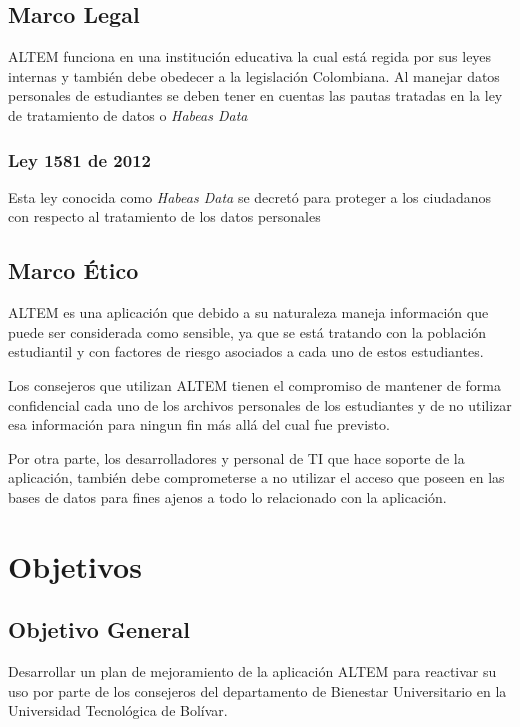 \subsection{Marco Legal}
ALTEM funciona en una institución educativa la cual está regida por sus leyes internas y también debe obedecer a la legislación Colombiana. Al manejar datos personales de estudiantes se deben tener en cuentas las pautas tratadas en la ley de tratamiento de datos o \textit{Habeas Data}

\subsubsection{ Ley 1581 de 2012 }
Esta ley conocida como \textit{Habeas Data} se decretó para proteger a los ciudadanos con respecto al tratamiento de los datos personales

\subsection{Marco Ético}
ALTEM es una aplicación que debido a su naturaleza maneja información que puede ser considerada como sensible, ya que se está tratando con la población estudiantil y con factores de riesgo asociados a cada uno de estos estudiantes. 

Los consejeros que utilizan ALTEM tienen el compromiso de mantener de forma confidencial cada uno de los archivos personales de los estudiantes y de no utilizar esa información para ningun fin más allá del cual fue previsto.

Por otra parte, los desarrolladores y personal de TI que hace soporte de la aplicación, también debe comprometerse a no utilizar el acceso que poseen en las bases de datos para fines ajenos a todo lo relacionado con la aplicación.
\section{Objetivos}

\subsection{Objetivo General}
Desarrollar un plan de mejoramiento de la aplicación ALTEM para reactivar su uso por parte de los consejeros del departamento de Bienestar Universitario en la Universidad Tecnológica de Bolívar.

